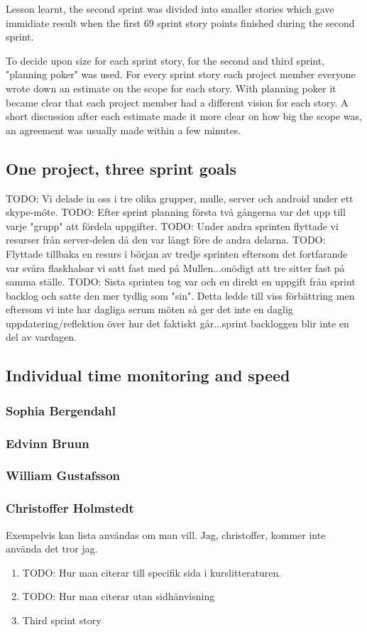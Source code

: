 Lesson learnt, the second sprint was divided into smaller stories which gave immidiate result when the first 69 sprint story points finished during the second sprint.

To decide upon size for each sprint story, for the second and third sprint, "planning poker" \cite[p.~42]{kniberg07} was used.
For every sprint story each project member everyone wrote down an estimate on the scope for each story.
With planning poker it became clear that each project member had a different vision for each story.
A short discussion after each estimate made it more clear on how big the scope was, an agreement was usually made within a few minutes.

%
%
\subsection{One project, three sprint goals}
TODO: Vi delade in oss i tre olika grupper, mulle, server och android under ett skype-möte.
TODO: Efter sprint planning första två gångerna var det upp till varje "grupp" att fördela uppgifter.
TODO: Under andra sprinten flyttade vi resurser från server-delen då den var långt före de andra delarna.
TODO: Flyttade tillbaka en resurs i början av tredje sprinten eftersom det fortfarande var svåra flaskhalsar vi satt fast med på Mullen...onödigt att tre sitter fast på samma ställe.
TODO: Sista sprinten tog var och en direkt en uppgift från sprint backlog och satte den mer tydlig som "sin". Detta ledde till viss förbättring men eftersom vi inte har dagliga scrum möten så ger det inte en daglig uppdatering/reflektion över hur det faktiskt går...sprint backloggen blir inte en del av vardagen.
\subsection{Individual time monitoring and speed}
\subsubsection{Sophia Bergendahl}
\subsubsection{Edvinn Bruun}
\subsubsection{William Gustafsson}
\subsubsection{Christoffer Holmstedt}
Exempelvis kan lista användas om man vill. Jag, christoffer, kommer inte använda det tror jag.
\begin{enumerate}
\item TODO: Hur man citerar till specifik sida i kurslitteraturen. \cite[p.~42]{kniberg07}
\item TODO: Hur man citerar utan sidhänvisning \cite{kniberg07}
\item Third sprint story
\end{enumerate}
